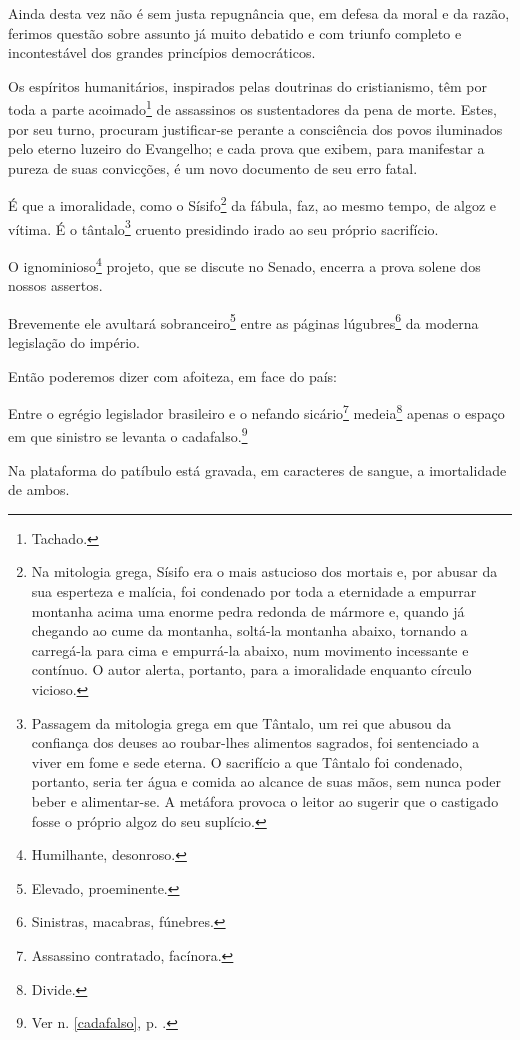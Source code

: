 Ainda desta vez não é sem justa repugnância que, em defesa da moral e da
razão, ferimos questão sobre assunto já muito debatido e com triunfo
completo e incontestável dos grandes princípios democráticos.

Os espíritos humanitários, inspirados pelas doutrinas do cristianismo,
têm por toda a parte acoimado\footnote{Tachado.} de assassinos os
sustentadores da pena de morte. Estes, por seu turno, procuram
justificar-se perante a consciência dos povos iluminados pelo eterno
luzeiro do Evangelho; e cada prova que exibem, para manifestar a pureza
de suas convicções, é um novo documento de seu erro fatal.

É que a imoralidade, como o Sísifo\footnote{Na mitologia grega, Sísifo
  era o mais astucioso dos mortais e, por abusar da sua esperteza e
  malícia, foi condenado por toda a eternidade a empurrar montanha acima
  uma enorme pedra redonda de mármore e, quando já chegando ao cume da
  montanha, soltá-la montanha abaixo, tornando a carregá-la para cima e
  empurrá-la abaixo, num movimento incessante e contínuo. O autor
  alerta, portanto, para a imoralidade enquanto círculo vicioso.} da
fábula, faz, ao mesmo tempo, de algoz e vítima. É o tântalo\footnote{
  Passagem da mitologia grega em que Tântalo, um rei que abusou da
  confiança dos deuses ao roubar-lhes alimentos sagrados, foi
  sentenciado a viver em fome e sede eterna. O sacrifício a que Tântalo
  foi condenado, portanto, seria ter água e comida ao alcance de suas
  mãos, sem nunca poder beber e alimentar-se. A metáfora provoca o
  leitor ao sugerir que o castigado fosse o próprio algoz do seu
  suplício.} cruento presidindo irado ao seu próprio sacrifício.

O ignominioso\footnote{Humilhante, desonroso.} projeto, que se discute
no Senado, encerra a prova solene dos nossos assertos.

Brevemente ele avultará sobranceiro\footnote{Elevado, proeminente.}
entre as páginas lúgubres\footnote{Sinistras, macabras, fúnebres.} da
moderna legislação do império.

Então poderemos dizer com afoiteza, em face do país:

Entre o egrégio legislador brasileiro e o nefando sicário\footnote{Assassino contratado, 
facínora.} medeia\footnote{Divide.} apenas o
espaço em que sinistro se levanta o cadafalso.\footnote{Ver n. \ref{cadafalso}, 
p. \pageref{cadafalso}.}

Na plataforma do patíbulo está gravada, em caracteres de sangue, a
imortalidade de ambos.

